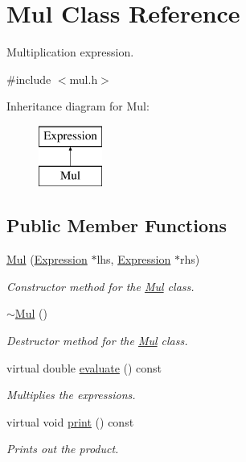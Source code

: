 \hypertarget{class_mul}{}\section{Mul Class Reference}
\label{class_mul}


Multiplication expression.  




{\ttfamily \#include $<$mul.\+h$>$}

Inheritance diagram for Mul\+:\begin{figure}[H]
\begin{center}
\leavevmode
\includegraphics[height=2.000000cm]{class_mul}
\end{center}
\end{figure}
\subsection*{Public Member Functions}
\begin{DoxyCompactItemize}
\item 
\hyperlink{class_mul_af8f36e90eda7ce256bd1e93635d55750}{Mul} (\hyperlink{class_expression}{Expression} $\ast$lhs, \hyperlink{class_expression}{Expression} $\ast$rhs)
\begin{DoxyCompactList}\small\item\em Constructor method for the \hyperlink{class_mul}{Mul} class. \end{DoxyCompactList}\item 
\hyperlink{class_mul_ad072b4a8fa7c2c7acb794454d3b97c8c}{$\sim$\+Mul} ()
\begin{DoxyCompactList}\small\item\em Destructor method for the \hyperlink{class_mul}{Mul} class. \end{DoxyCompactList}\item 
virtual double \hyperlink{class_mul_a3e98f760d06aaac61dda9ab57d174a35}{evaluate} () const
\begin{DoxyCompactList}\small\item\em Multiplies the expressions. \end{DoxyCompactList}\item 
virtual void \hyperlink{class_mul_a0aa9276f2fc04dd9afc77bf47542e5ec}{print} () const
\begin{DoxyCompactList}\small\item\em Prints out the product. \end{DoxyCompactList}\end{DoxyCompactItemize}


